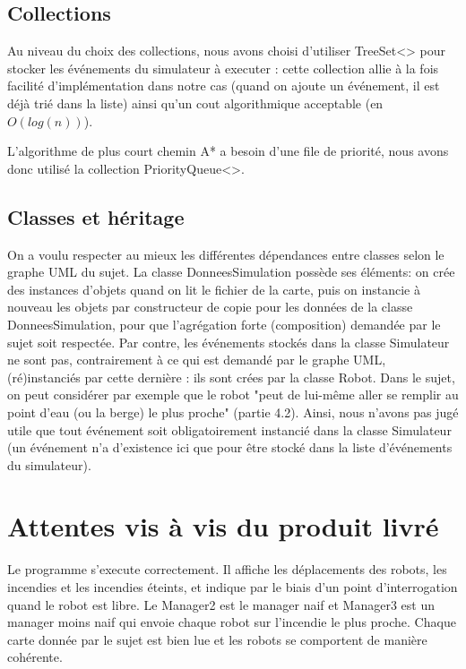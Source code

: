 \documentclass[a4paper,11pt]{article}
\begin{document}
\subsection{Collections}

Au niveau du choix des collections, nous avons choisi d'utiliser TreeSet<> pour stocker les événements du simulateur à executer : cette collection allie à la fois facilité d'implémentation dans notre cas (quand on ajoute un événement, il est déjà trié dans la liste) ainsi qu'un cout algorithmique acceptable (en $O(log(n))$).

L'algorithme de plus court chemin A* a besoin d'une file de priorité, nous avons donc utilisé la collection PriorityQueue<>.

\subsection{Classes et héritage}

On a voulu respecter au mieux les différentes dépendances entre classes selon le graphe UML du sujet. 
La classe DonneesSimulation possède ses éléments: on crée des instances d'objets quand on lit le fichier de la carte, puis on instancie à nouveau les objets par constructeur de copie pour les données de la classe DonneesSimulation, pour que l'agrégation forte (composition) demandée par le sujet soit respectée.
Par contre, les événements stockés dans la classe Simulateur ne sont pas, contrairement à ce qui est demandé par le graphe UML, (ré)instanciés par cette dernière : ils sont crées par la classe Robot. Dans le sujet, on peut considérer par exemple que le robot "peut de lui-même aller se remplir au point d’eau (ou la berge) le plus proche" (partie 4.2). Ainsi, nous n'avons pas jugé utile que tout événement soit obligatoirement instancié dans la classe Simulateur (un événement n'a d'existence ici que pour être stocké dans la liste d'événements du simulateur).

\newpage

\section{Attentes vis à vis du produit livré}

Le programme s'execute correctement. Il affiche les déplacements des robots, les incendies et les incendies éteints, et indique par le biais d'un point d'interrogation quand le robot est libre.
Le Manager2 est le manager naif et Manager3 est un manager moins naif qui envoie chaque robot sur l'incendie le plus proche.
Chaque carte donnée par le sujet est bien lue et les robots se comportent de manière cohérente.
\end{document}
